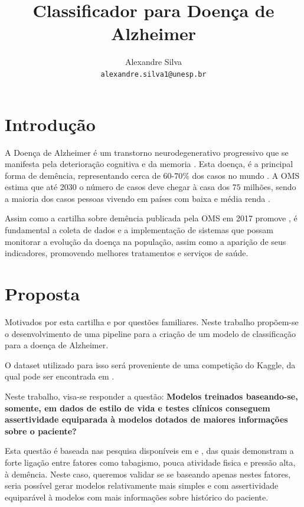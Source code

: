 \documentclass{paper}
\title{Classificador para Doença de Alzheimer}
\author{Alexandre Silva \\ \texttt{alexandre.silva1@unesp.br}}
\begin{document}
	\maketitle
	
\section{Introdução}

A Doença de Alzheimer é um transtorno neurodegenerativo progressivo que se manifesta pela deterioração cognitiva e da memoria \cite{GOV}. Esta doença, é a principal forma de demência, representando cerca de $60$-$70\%$ dos casos no mundo \cite{OMS}. A OMS estima que até 2030 o número de casos deve chegar à casa dos $75$ milhões, sendo a maioria dos casos pessoas vivendo em países com baixa e média renda \cite{OMS}.

Assim como a cartilha sobre demência publicada pela OMS em 2017 promove \cite{OMS}, é fundamental a coleta de dados e a implementação de sistemas que possam monitorar a evolução da doença na população, assim como a aparição de seus indicadores, promovendo melhores tratamentos e serviços de saúde.

\section{Proposta}

Motivados por esta cartilha \cite{OMS} e por questões familiares. Neste trabalho propõem-se o desenvolvimento de uma pipeline para a criação de um modelo de classificação para a doença de Alzheimer.

O dataset utilizado para isso será proveniente de uma competição do Kaggle, da qual pode ser encontrada em \cite{Kaggle}. 

Neste trabalho, visa-se responder a questão: \textbf{Modelos treinados baseando-se, somente, em dados de estilo de vida e testes clínicos conseguem assertividade equiparada à modelos dotados de maiores informações sobre o paciente?}

Esta questão é baseada nas pesquisa disponíveis em \cite{Lifestyle} e \cite{Cardiovascular}, das quais demonstram a forte ligação entre fatores como tabagismo, pouca atividade fisica e pressão alta, à demência. Neste caso, queremos validar se se baseando apenas nestes fatores, seria possível gerar modelos relativamente mais simples e com assertividade equiparável à modelos com mais informações sobre histórico do paciente.
\end{document}
